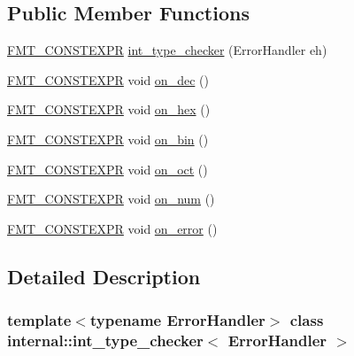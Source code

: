 \subsection*{Public Member Functions}
\begin{DoxyCompactItemize}
\item 
\hyperlink{core_8h_a69201cb276383873487bf68b4ef8b4cd}{F\+M\+T\+\_\+\+C\+O\+N\+S\+T\+E\+X\+PR} \hyperlink{classinternal_1_1int__type__checker_ab2aeccba63ca09791645ff5b28512c57}{int\+\_\+type\+\_\+checker} (Error\+Handler eh)
\item 
\hyperlink{core_8h_a69201cb276383873487bf68b4ef8b4cd}{F\+M\+T\+\_\+\+C\+O\+N\+S\+T\+E\+X\+PR} void \hyperlink{classinternal_1_1int__type__checker_ad5b0a2534b245ce2c5065fb26a1ca862}{on\+\_\+dec} ()
\item 
\hyperlink{core_8h_a69201cb276383873487bf68b4ef8b4cd}{F\+M\+T\+\_\+\+C\+O\+N\+S\+T\+E\+X\+PR} void \hyperlink{classinternal_1_1int__type__checker_ac20c7c499f7a4f0cdab9d3c0422fe1d0}{on\+\_\+hex} ()
\item 
\hyperlink{core_8h_a69201cb276383873487bf68b4ef8b4cd}{F\+M\+T\+\_\+\+C\+O\+N\+S\+T\+E\+X\+PR} void \hyperlink{classinternal_1_1int__type__checker_ad4e6f52b4f8cf156223d24c19b1928fc}{on\+\_\+bin} ()
\item 
\hyperlink{core_8h_a69201cb276383873487bf68b4ef8b4cd}{F\+M\+T\+\_\+\+C\+O\+N\+S\+T\+E\+X\+PR} void \hyperlink{classinternal_1_1int__type__checker_ac67ad988c660e553e4b09232c6450e3d}{on\+\_\+oct} ()
\item 
\hyperlink{core_8h_a69201cb276383873487bf68b4ef8b4cd}{F\+M\+T\+\_\+\+C\+O\+N\+S\+T\+E\+X\+PR} void \hyperlink{classinternal_1_1int__type__checker_a909fd19b4b6f6a60050328e53b27305c}{on\+\_\+num} ()
\item 
\hyperlink{core_8h_a69201cb276383873487bf68b4ef8b4cd}{F\+M\+T\+\_\+\+C\+O\+N\+S\+T\+E\+X\+PR} void \hyperlink{classinternal_1_1int__type__checker_a9da79c30a3dbabe952392ccdd9a45acb}{on\+\_\+error} ()
\end{DoxyCompactItemize}


\subsection{Detailed Description}
\subsubsection*{template$<$typename Error\+Handler$>$\newline
class internal\+::int\+\_\+type\+\_\+checker$<$ Error\+Handler $>$}



